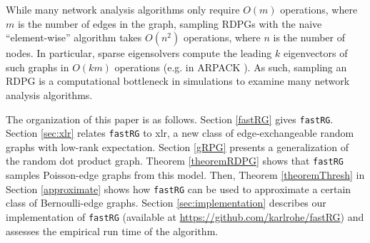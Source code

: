 \documentclass[twoside,11pt]{article}
\begin{document}
While many network analysis algorithms only require $O(m)$ operations, where $m$ is the number of edges in the graph, sampling RDPGs with the naive ``element-wise'' algorithm takes  $O(n^2)$ operations, where $n$ is the number of nodes.  In particular, sparse eigensolvers compute the leading $k$ eigenvectors of such graphs in $O(km)$ operations (e.g. in ARPACK \citealt{lehoucqarpack}).  As such, sampling an RDPG is a computational bottleneck in simulations to examine many network analysis algorithms.


The organization of this paper is as follows.  Section \ref{fastRG} gives \texttt{fastRG}. Section \ref{sec:xlr} relates \texttt{fastRG} to xlr, a new class of edge-exchangeable random graphs with low-rank expectation.  Section \ref{gRPG} presents a generalization of the random dot product graph. Theorem \ref{theoremRDPG} shows that \texttt{fastRG} samples Poisson-edge graphs from this model.  Then, Theorem \ref{theoremThresh} in Section \ref{approximate} shows how \texttt{fastRG} can be used to approximate a certain class of Bernoulli-edge graphs.  Section \ref{sec:implementation} describes our implementation of \texttt{fastRG} (available at \url{https://github.com/karlrohe/fastRG}) and assesses the empirical run time of the algorithm.


\end{document}
